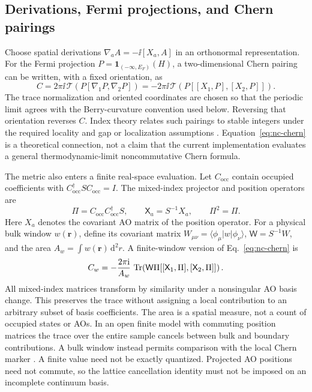 \subsection{Derivations, Fermi projections, and Chern pairings}
Choose spatial derivations
$\nabla_a A=-\ii[X_a,A]$ in an orthonormal representation.
For the Fermi projection $P=\mathbf1_{(-\infty,E_F)}(H)$, a
two-dimensional Chern pairing can be written, with a fixed orientation,
as
\begin{equation}
 C=2\pi\ii\,\mathcal T\!\left(P[\nabla_1P,\nabla_2P]\right)
   =-2\pi\ii\,\mathcal T\!\left(P[[X_1,P],[X_2,P]]\right).
 \label{eq:nc-chern}
\end{equation}
The trace normalization and oriented coordinates are chosen so that
the periodic limit agrees with the Berry-curvature convention used
below. Reversing that orientation reverses $C$.
Index theory relates such pairings to stable integers under the
required locality and gap or localization assumptions
\cite{ProdanSchulzBaldes2016}. Equation~\eqref{eq:nc-chern} is a theoretical
connection, not a claim that the current implementation evaluates a
general thermodynamic-limit noncommutative Chern formula.

The metric also enters a finite real-space evaluation. Let
$C_{\mathrm{occ}}$ contain occupied coefficients with
$C_{\mathrm{occ}}^\dagger S C_{\mathrm{occ}}=I$. The mixed-index
projector and position operators are
\begin{equation}
 \Pi=C_{\mathrm{occ}}C_{\mathrm{occ}}^\dagger S,\qquad
 \mathsf X_a=S^{-1}X_a,\qquad \Pi^2=\Pi.
 \label{eq:mixed-fermi-projector}
\end{equation}
Here $X_a$ denotes the covariant AO matrix of the position operator.
For a physical bulk window $w(\mathbf r)$, define its covariant
matrix $W_{\mu\nu}=\langle\phi_\mu|w|\phi_\nu\rangle$,
$\mathsf W=S^{-1}W$, and the area
$A_w=\int w(\mathbf r)\,\mathrm d^2r$. A finite-window version of
Eq.~\eqref{eq:nc-chern} is
\begin{equation}
 C_w=-\frac{2\pi\mathrm{i}}{A_w}\,
 \operatorname{Tr}\!\left(\mathsf W\Pi
   [[\mathsf X_1,\Pi],[\mathsf X_2,\Pi]]\right).
 \label{eq:finite-window-chern}
\end{equation}
All mixed-index matrices transform by similarity under a nonsingular
AO basis change. This preserves the trace without assigning a local
contribution to an arbitrary subset of basis coefficients.
The area is a spatial measure, not a count of occupied states or AOs.
In an open finite model with commuting position matrices the trace
over the entire sample cancels between bulk and boundary contributions.
A bulk window instead permits comparison with the local Chern marker
\cite{BiancoResta2011}. A finite value need not be exactly quantized.
Projected AO positions need not commute, so the lattice cancellation
identity must not be imposed on an incomplete continuum basis.


